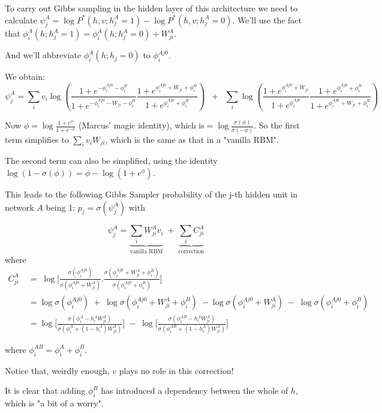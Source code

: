 To carry out Gibbs sampling in the hidden layer of this architecture we need to calculate $\psi^A_j = \log P^*(h,v ; h^A_j =1 ) - \log P^*(h,v ; h^A_j = 0)$. We'll use the fact that $\phi^A_i(h ; h^A_j=1) = \phi^A_i(h ; h^A_j=0) + W^A_{ji}$.

And we'll abbreviate $\phi^A_i(h ; h_j=0)$ to $\phi^{Aj0}_i$.

We obtain:
$$\psi^A_j = \sum_i v_i \log \left( \frac{1+ e^{-\phi^{Aj0}_i - \phi^B_i}}{1+e^{-\phi^{Aj0}_i - W_{ji} -\phi^B_i}} \frac{1+ e^{\phi^{Aj0}_i + W_{ji} + \phi^B_i}}{1+e^{\phi_i^{Aj0} + \phi^B_i}}\right) \;\;+ \;\;\sum_i \log \left(\frac{1+e^{\phi_i^{Aj0} + W_{ji}}}{1+ e^{\phi_i^{Aj0}}}
\frac{1+e^{\phi_i^{Aj0} + \phi^B_i}}{1+ e^{\phi_i^{Aj0} + W_{ji} + \phi^B_i}} \right)
$$

Now $\phi = \log \frac{1+e^{\phi}}{1+e^{-\phi}}$ (Marcus' magic identity), which is$ = \log \frac{\sigma(\phi)}{\sigma(-\phi)}$.
So the first term simplifies to
$ \sum_i v_i W_{ji}$, which is the same as that in a "vanilla RBM".

The second term can also be simplified, using the identity $\log(1-\sigma(\phi)) = \phi - \log(1+e^\phi)$.

This leads to the following Gibbs Sampler probability of the j-th hidden unit in network $A$ being 1: $p_j = \sigma(\psi_j^A)$ with

$$\psi_j^A = \underbrace{\sum_i W^A_{ji} v_i}_\text{vanilla RBM} \; + \; \underbrace{\sum_i C^A_{ji}}_\text{correction} $$
where
$$
\begin{aligned}
C^A_{ji} \; &= \;\log \bigg[ \frac{\sigma (\phi_i^{Aj0})}{\sigma (\phi_i^{Aj0} + W^A_{ji})} . \frac{\sigma (\phi_i^{Aj0} + W_{ji}^A + \phi_i^B) }{\sigma (\phi_i^{Aj0} + \phi_i^B)} \bigg]
\\
&= \log \sigma(\phi_i^{Aj0})  \; + \; \log \sigma (\phi_i^{Aj0} + W^A_{ji} + \phi_i^B) \;- \log \sigma (\phi_i^{Aj0} + W^A_{ji})  \; - \; \log \sigma ( \phi_i^{Aj0} + \phi_i^B)
\\
&= \log \bigg[ \frac{\sigma(\phi_i^{A} - h^A_i W^A_{ji})}{\sigma (\phi_i^{A} + (1-h^A_i) W^A_{ji})} \bigg]  \; - \; \log \bigg[ \frac{ \sigma ( \phi_i^{AB} - h^A_i W^A_{ji})}{\sigma (\phi_i^{AB} + (1-h^A_i) W^A_{ji})} \bigg]
\end{aligned} $$

where $\phi_i^{AB} = \phi_i^{A} + \phi_i^{B}$.

Notice that, weirdly enough, $v$ plays no role in this correction!

It is clear that adding $\phi^B_i$ has introduced a dependency between the whole of $h$, which is "a bit of a worry".

